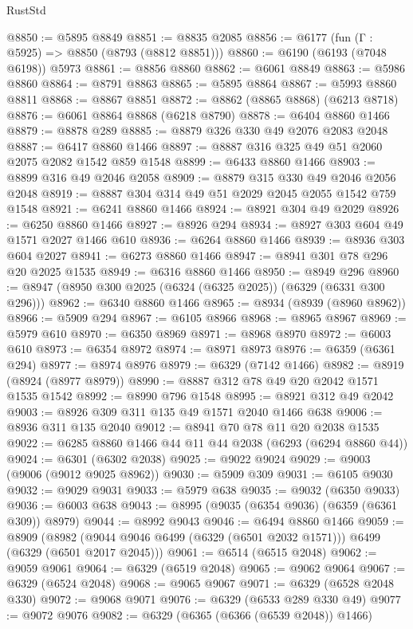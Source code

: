 \begin{lexlean}{RustStd}
\begin{coremodule}
{\begin{coremodule}
{{{{{{{{{{{{{{{{{{{{{{{{{{{{{{{{{{{@8850 := @5895 @8849
@8851 := @8835 @2085
@8856 := @6177 (fun (Γ : @5925) => @8850 (@8793 (@8812 @8851)))
@8860 := @6190 (@6193 (@7048 @6198)) @5973
@8861 := @8856 @8860
@8862 := @6061 @8849
@8863 := @5986 @8860
@8864 := @8791 @8863
@8865 := @5895 @8864
@8867 := @5993 @8860 @8811
@8868 := @8867 @8851
@8872 := @8862 (@8865 @8868) (@6213 @8718)
@8876 := @6061 @8864 @8868 (@6218 @8790)
@8878 := @6404 @8860 @1466
@8879 := @8878 @289
@8885 := @8879 @326 @330 @49 @2076 @2083 @2048
@8887 := @6417 @8860 @1466
@8897 := @8887 @316 @325 @49 @51 @2060 @2075 @2082 @1542 @859 @1548
@8899 := @6433 @8860 @1466
@8903 := @8899 @316 @49 @2046 @2058
@8909 := @8879 @315 @330 @49 @2046 @2056 @2048
@8919 := @8887 @304 @314 @49 @51 @2029 @2045 @2055 @1542 @759 @1548
@8921 := @6241 @8860 @1466
@8924 := @8921 @304 @49 @2029
@8926 := @6250 @8860 @1466
@8927 := @8926 @294
@8934 := @8927 @303 @604 @49 @1571 @2027 @1466 @610
@8936 := @6264 @8860 @1466
@8939 := @8936 @303 @604 @2027
@8941 := @6273 @8860 @1466
@8947 := @8941 @301 @78 @296 @20 @2025 @1535
@8949 := @6316 @8860 @1466
@8950 := @8949 @296
@8960 := @8947 (@8950 @300 @2025 (@6324 (@6325 @2025)) (@6329 (@6331 @300 @296)))
@8962 := @6340 @8860 @1466
@8965 := @8934 (@8939 (@8960 @8962))
@8966 := @5909 @294
@8967 := @6105 @8966
@8968 := @8965 @8967
@8969 := @5979 @610
@8970 := @6350 @8969
@8971 := @8968 @8970
@8972 := @6003 @610
@8973 := @6354 @8972
@8974 := @8971 @8973
@8976 := @6359 (@6361 @294)
@8977 := @8974 @8976
@8979 := @6329 (@7142 @1466)
@8982 := @8919 (@8924 (@8977 @8979))
@8990 := @8887 @312 @78 @49 @20 @2042 @1571 @1535 @1542
@8992 := @8990 @796 @1548
@8995 := @8921 @312 @49 @2042
@9003 := @8926 @309 @311 @135 @49 @1571 @2040 @1466 @638
@9006 := @8936 @311 @135 @2040
@9012 := @8941 @70 @78 @11 @20 @2038 @1535
@9022 := @6285 @8860 @1466 @44 @11 @44 @2038 (@6293 (@6294 @8860 @44))
@9024 := @6301 (@6302 @2038)
@9025 := @9022 @9024
@9029 := @9003 (@9006 (@9012 @9025 @8962))
@9030 := @5909 @309
@9031 := @6105 @9030
@9032 := @9029 @9031
@9033 := @5979 @638
@9035 := @9032 (@6350 @9033)
@9036 := @6003 @638
@9043 := @8995 (@9035 (@6354 @9036) (@6359 (@6361 @309)) @8979)
@9044 := @8992 @9043
@9046 := @6494 @8860 @1466
@9059 := @8909
    (@8982 (@9044 @9046 @6499 (@6329 (@6501 @2032 @1571))) @6499 (@6329 (@6501 @2017 @2045)))
@9061 := @6514 (@6515 @2048)
@9062 := @9059 @9061
@9064 := @6329 (@6519 @2048)
@9065 := @9062 @9064
@9067 := @6329 (@6524 @2048)
@9068 := @9065 @9067
@9071 := @6329 (@6528 @2048 @330)
@9072 := @9068 @9071
@9076 := @6329 (@6533 @289 @330 @49)
@9077 := @9072 @9076
@9082 := @6329 (@6365 (@6366 (@6539 @2048)) @1466)
}}}}}}}}}}}}}}}}}}}}}}}}}}}}}}}}}}}
\end{coremodule}}
\end{coremodule}
\end{lexlean}
